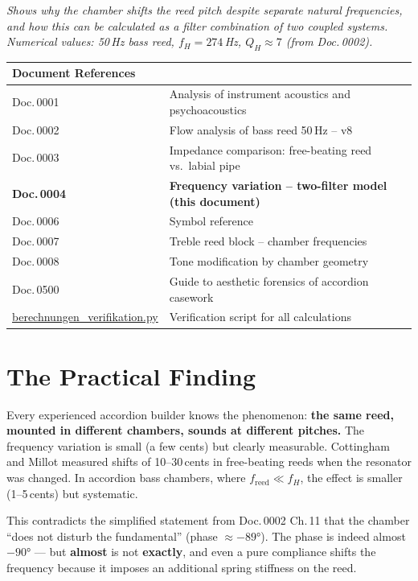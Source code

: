 \documentclass[11pt,a4paper]{article}
\begin{document}
\hbmaketitle

{\small\itshape Shows why the chamber shifts the reed pitch despite separate natural frequencies, and how this can be calculated as a filter combination of two coupled systems. Numerical values: 50\,Hz bass reed, $f_H = 274$\,Hz, $Q_H \approx 7$ (from Doc.\,0002).}

\vspace{2mm}
\begin{center}\small
\begin{tabularx}{\textwidth}{l X}
\hbtoprule
\textbf{Document References} \\
\midrule
Doc.\,0001 & Analysis of instrument acoustics and psychoacoustics \\
Doc.\,0002 & Flow analysis of bass reed 50\,Hz -- v8 \\
Doc.\,0003 & Impedance comparison: free-beating reed vs.\ labial pipe \\
\textbf{Doc.\,0004} & \textbf{Frequency variation -- two-filter model (this document)} \\
Doc.\,0006 & Symbol reference \\
Doc.\,0007 & Treble reed block -- chamber frequencies \\
Doc.\,0008 & Tone modification by chamber geometry \\
Doc.\,0500 & Guide to aesthetic forensics of accordion casework \\
\midrule
\href{berechnungen_verifikation.py}{berechnungen\_verifikation.py} & Verification script for all calculations \\
\bottomrule
\end{tabularx}
\end{center}

\vspace{4mm}

\section{The Practical Finding}

Every experienced accordion builder knows the phenomenon: \textbf{the same reed, mounted in different chambers, sounds at different pitches.} The frequency variation is small (a few cents) but clearly measurable. Cottingham and Millot measured shifts of 10--30\,cents in free-beating reeds when the resonator was changed. In accordion bass chambers, where $f_\text{reed} \ll f_H$, the effect is smaller (1--5\,cents) but systematic.

This contradicts the simplified statement from Doc.\,0002 Ch.\,11 that the chamber ``does not disturb the fundamental'' (phase $\approx -89°$). The phase is indeed almost $-90°$ --- but \textbf{almost} is not \textbf{exactly}, and even a pure compliance shifts the frequency because it imposes an additional spring stiffness on the reed.
\end{document}
